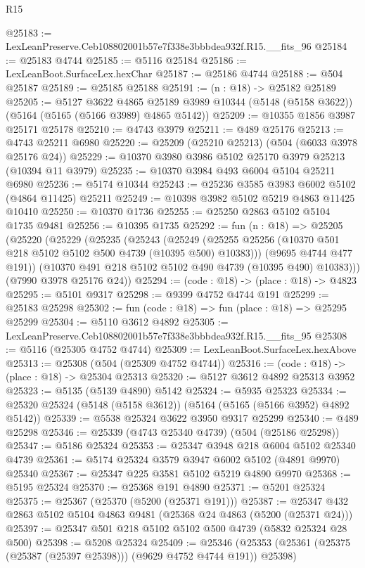 \begin{lexlean}{R15}
\begin{coremodule}
{{{{{{{{{{{@25183 := LexLeanPreserve.Ceb108802001b57e7f338e3bbbdea932f.R15.__fits_96
@25184 := @25183 @4744
@25185 := @5116 @25184
@25186 := LexLeanBoot.SurfaceLex.hexChar
@25187 := @25186 @4744
@25188 := @504 @25187
@25189 := @25185 @25188
@25191 := (n : @18) -> @25182 @25189
@25205 := @5127
    @3622
    @4865
    @25189
    @3989
    @10344
    (@5148 (@5158 @3622))
    (@5164 (@5165 (@5166 @3989) @4865 @5142))
@25209 := @10355 @1856 @3987 @25171 @25178
@25210 := @4743 @3979
@25211 := @489 @25176
@25213 := @4743 @25211 @6980
@25220 := @25209 (@25210 @25213) (@504 (@6033 @3978 @25176 @24))
@25229 := @10370 @3980 @3986 @5102 @25170 @3979 @25213 (@10394 @11 @3979)
@25235 := @10370 @3984 @493 @6004 @5104 @25211 @6980
@25236 := @5174 @10344
@25243 := @25236 @3585 @3983 @6002 @5102 (@4864 @11425) @25211
@25249 := @10398 @3982 @5102 @5219 @4863 @11425 @10410
@25250 := @10370 @1736
@25255 := @25250 @2863 @5102 @5104 @1735 @9481
@25256 := @10395 @1735
@25292 := fun (n : @18) =>
  @25205
    (@25220
      (@25229
        (@25235
          (@25243
            (@25249 (@25255 @25256 (@10370 @501 @218 @5102 @5102 @500 @4739 (@10395 @500) @10383)))
            (@9695 @4744 @477 @191))
          (@10370 @491 @218 @5102 @5102 @490 @4739 (@10395 @490) @10383)))
      (@7990 @3978 @25176 @24))
@25294 := (code : @18) -> (place : @18) -> @4823
@25295 := @5101 @9317
@25298 := @9399 @4752 @4744 @191
@25299 := @25183 @25298
@25302 := fun (code : @18) => fun (place : @18) => @25295 @25299
@25304 := @5110 @3612 @4892
@25305 := LexLeanPreserve.Ceb108802001b57e7f338e3bbbdea932f.R15.__fits_95
@25308 := @5116 (@25305 @4752 @4744)
@25309 := LexLeanBoot.SurfaceLex.hexAbove
@25313 := @25308 (@504 (@25309 @4752 @4744))
@25316 := (code : @18) -> (place : @18) -> @25304 @25313
@25320 := @5127 @3612 @4892 @25313 @3952
@25323 := @5135 (@5139 @4890) @5142
@25324 := @5935 @25323
@25334 := @25320 @25324 (@5148 (@5158 @3612)) (@5164 (@5165 (@5166 @3952) @4892 @5142))
@25339 := @5538 @25324 @3622 @3950 @9317 @25299
@25340 := @489 @25298
@25346 := @25339 (@4743 @25340 @4739) (@504 (@25186 @25298))
@25347 := @5186 @25324
@25353 := @25347 @3948 @218 @6004 @5102 @25340 @4739
@25361 := @5174 @25324 @3579 @3947 @6002 @5102 (@4891 @9970) @25340
@25367 := @25347 @225 @3581 @5102 @5219 @4890 @9970
@25368 := @5195 @25324
@25370 := @25368 @191 @4890
@25371 := @5201 @25324
@25375 := @25367 (@25370 (@5200 (@25371 @191)))
@25387 := @25347 @432 @2863 @5102 @5104 @4863 @9481 (@25368 @24 @4863 (@5200 (@25371 @24)))
@25397 := @25347 @501 @218 @5102 @5102 @500 @4739 (@5832 @25324 @28 @500)
@25398 := @5208 @25324
@25409 := @25346 (@25353 (@25361 (@25375 (@25387 (@25397 @25398))) (@9629 @4752 @4744 @191)) @25398)
}}}}}}}}}}}
\end{coremodule}
\end{lexlean}
